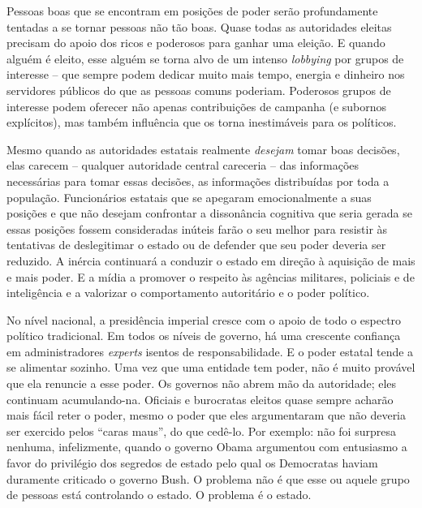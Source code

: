 Pessoas boas que se encontram em posições de poder serão profundamente tentadas a se tornar pessoas não tão boas. Quase todas as autoridades eleitas precisam do apoio dos ricos e poderosos para ganhar uma eleição. E quando alguém é eleito, esse alguém se torna alvo de um intenso \emph{lobbying} por grupos de interesse -- que sempre podem dedicar muito mais tempo, energia e dinheiro nos servidores públicos do que as pessoas comuns poderiam. Poderosos grupos de interesse podem oferecer não apenas contribuições de campanha (e subornos explícitos), mas também influência que os torna inestimáveis para os políticos.

Mesmo quando as autoridades estatais realmente \emph{desejam} tomar boas decisões, elas carecem -- qualquer autoridade central careceria -- das informações necessárias para tomar essas decisões, as informações distribuídas por toda a população. Funcionários estatais que se apegaram emocionalmente a suas posições e que não desejam confrontar a dissonância cognitiva que seria gerada se essas posições fossem consideradas inúteis farão o seu melhor para resistir às tentativas de deslegitimar o estado ou de defender que seu poder deveria ser reduzido. A inércia continuará a conduzir o estado em direção à aquisição de mais e mais poder. E a mídia a promover o respeito às agências militares, policiais e de inteligência e a valorizar o comportamento autoritário e o poder político.

No nível nacional, a presidência imperial cresce com o apoio de todo o espectro político tradicional. Em todos os níveis de governo, há uma crescente confiança em administradores \emph{experts} isentos de responsabilidade. E o poder estatal tende a se alimentar sozinho. Uma vez que uma entidade tem poder, não é muito provável que ela renuncie a esse poder. Os governos não abrem mão da autoridade; eles continuam acumulando-na. Oficiais e burocratas eleitos quase sempre acharão mais fácil reter o poder, mesmo o poder que eles argumentaram que não deveria ser exercido pelos ``caras maus'', do que cedê-lo. Por exemplo: não foi surpresa nenhuma, infelizmente, quando o governo Obama argumentou com entusiasmo a favor do privilégio dos segredos de estado pelo qual os Democratas haviam duramente criticado o governo Bush. O problema não é que esse ou aquele grupo de pessoas está controlando o estado. O problema é o estado.

